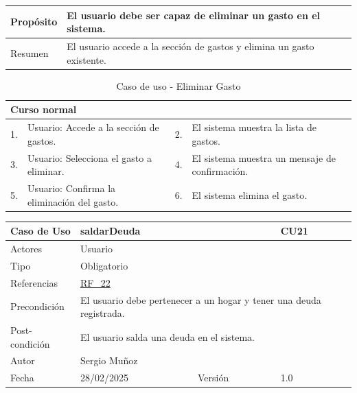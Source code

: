 \begin{table}[H]
    \centering
    \begin{tabular}{| m{} | m{} | m{} | m{} |}
        \hline
        Propósito & \multicolumn{3}{m{0.67\textwidth}|}{El usuario debe ser capaz de eliminar un gasto en el sistema.} \\ 
        \hline
        Resumen & \multicolumn{3}{m{0.67\textwidth}|}{El usuario accede a la sección de gastos y elimina un gasto existente.} \\ 
        \hline
    \end{tabular}
\end{table}

\begin{table}[H]
    \centering
    \begin{tabular}{| m{} | m{} | m{} | m{} |}
        \hline
        \multicolumn{4}{|m{0.9\textwidth}|}{Curso normal} \\ 
        \hline
        1. & Usuario: Accede a la sección de gastos. 
        & 2. & El sistema muestra la lista de gastos. \\ 
        \hline
        3. & Usuario: Selecciona el gasto a eliminar. 
        & 4. & El sistema muestra un mensaje de confirmación. \\ 
        \hline
        5. & Usuario: Confirma la eliminación del gasto. 
        & 6. & El sistema elimina el gasto. \\ 
        \hline
    \end{tabular}
    \caption{Caso de uso - Eliminar Gasto}
\end{table}

\newpage

\begin{table}[H]
    \centering
    \begin{tabular}{| m{} | m{} | m{} | m{} |}
        \hline
        \rowcolor[HTML]{C0C0C0} Caso de Uso & \multicolumn{2}{|m{0.43\textwidth}|}{saldarDeuda} &  CU21\\ 
        \hline
        Actores & \multicolumn{3}{l|}{Usuario} \\ 
        \hline
        Tipo & \multicolumn{3}{l|}{Obligatorio} \\ 
        \hline
        Referencias & \multicolumn{3}{l|}{\hyperref[req:RF22]{RF\_22}} \\ 
        \hline
        Precondición & \multicolumn{3}{m{0.67\textwidth}|}{El usuario debe pertenecer a un hogar y tener una deuda registrada.} \\ 
        \hline
        Post-condición & \multicolumn{3}{m{0.67\textwidth}|}{El usuario salda una deuda en el sistema.} \\ 
        \hline
        Autor & \multicolumn{3}{l|}{Sergio Muñoz} \\ 
        \hline
        Fecha & 28/02/2025 & Versión & 1.0 \\ 
        \hline
    \end{tabular}
\end{table}

